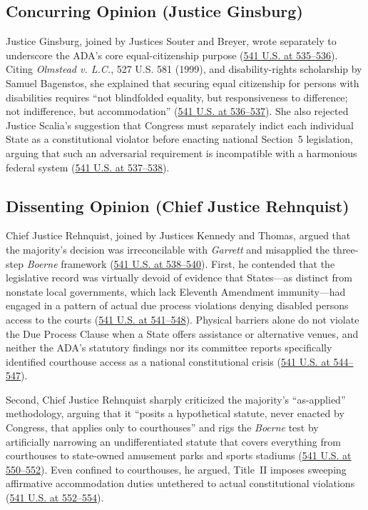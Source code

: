 \documentclass[12pt]{article}
\begin{document}
\subsection{Concurring Opinion (Justice Ginsburg)}
Justice Ginsburg, joined by Justices Souter and Breyer, wrote separately to underscore the ADA's core equal-citizenship purpose (\href{https://www.law.cornell.edu/supremecourt/text/541/509}{541 U.S. at 535--536}). Citing \textit{Olmstead v. L.C.}, 527 U.S. 581 (1999), and disability-rights scholarship by Samuel Bagenstos, she explained that securing equal citizenship for persons with disabilities requires ``not blindfolded equality, but responsiveness to difference; not indifference, but accommodation'' (\href{https://www.law.cornell.edu/supremecourt/text/541/509}{541 U.S. at 536--537}). She also rejected Justice Scalia's suggestion that Congress must separately indict each individual State as a constitutional violator before enacting national Section~5 legislation, arguing that such an adversarial requirement is incompatible with a harmonious federal system (\href{https://www.law.cornell.edu/supremecourt/text/541/509}{541 U.S. at 537--538}).

\subsection{Dissenting Opinion (Chief Justice Rehnquist)}
Chief Justice Rehnquist, joined by Justices Kennedy and Thomas, argued that the majority's decision was irreconcilable with \textit{Garrett} and misapplied the three-step \textit{Boerne} framework (\href{https://www.law.cornell.edu/supremecourt/text/541/509}{541 U.S. at 538--540}). First, he contended that the legislative record was virtually devoid of evidence that States---as distinct from nonstate local governments, which lack Eleventh Amendment immunity---had engaged in a pattern of actual due process violations denying disabled persons access to the courts (\href{https://www.law.cornell.edu/supremecourt/text/541/509}{541 U.S. at 541--548}). Physical barriers alone do not violate the Due Process Clause when a State offers assistance or alternative venues, and neither the ADA's statutory findings nor its committee reports specifically identified courthouse access as a national constitutional crisis (\href{https://www.law.cornell.edu/supremecourt/text/541/509}{541 U.S. at 544--547}).

Second, Chief Justice Rehnquist sharply criticized the majority's ``as-applied'' methodology, arguing that it ``posits a hypothetical statute, never enacted by Congress, that applies only to courthouses'' and rigs the \textit{Boerne} test by artificially narrowing an undifferentiated statute that covers everything from courthouses to state-owned amusement parks and sports stadiums (\href{https://www.law.cornell.edu/supremecourt/text/541/509}{541 U.S. at 550--552}). Even confined to courthouses, he argued, Title~II imposes sweeping affirmative accommodation duties untethered to actual constitutional violations (\href{https://www.law.cornell.edu/supremecourt/text/541/509}{541 U.S. at 552--554}).
\end{document}
